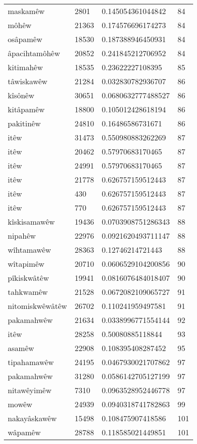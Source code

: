 \begin{longtable}{llll}
maskamêw & 2801 & 0.145054361044842 & 84\\
môhêw & 21363 & 0.174576696174273 & 84\\
osâpamêw & 18530 & 0.187388946450931 & 84\\
âpacihtamôhêw & 20852 & 0.241845212706952 & 84\\
kitimahêw & 18535 & 0.23622227108395 & 85\\
tâwiskawêw & 21284 & 0.032830782936707 & 86\\
kîsônêw & 30651 & 0.0680632777488527 & 86\\
kitâpamêw & 18800 & 0.105012428618194 & 86\\
pakitinêw & 24810 & 0.16486586731671 & 86\\
itêw & 31473 & 0.550980883262269 & 87\\
itêw & 20462 & 0.57970683170465 & 87\\
itêw & 24991 & 0.57970683170465 & 87\\
itêw & 21778 & 0.626757159512443 & 87\\
itêw & 430 & 0.626757159512443 & 87\\
itêw & 770 & 0.626757159512443 & 87\\
kîskisamawêw & 19436 & 0.0703908751286343 & 88\\
nipahêw & 22976 & 0.0921620493711147 & 88\\
wîhtamawêw & 28363 & 0.12746214721443 & 88\\
wîtapimêw & 20710 & 0.0606529104200856 & 90\\
pîkiskwâtêw & 19941 & 0.0816076484018407 & 90\\
tahkwamêw & 21528 & 0.0672082109065727 & 91\\
nitomiskwêwâtêw & 26702 & 0.110241959497581 & 91\\
pakamahwêw & 21634 & 0.0338996771554144 & 92\\
itêw & 28258 & 0.50080885118844 & 93\\
asamêw & 22908 & 0.108395408287452 & 95\\
tipahamawêw & 24195 & 0.0467930021707862 & 97\\
pakamahwêw & 31280 & 0.0586142705127199 & 97\\
nitawêyimêw & 7310 & 0.0963528952446778 & 97\\
mowêw & 24939 & 0.0940318741782863 & 99\\
nakayâskawêw & 15498 & 0.108475907418586 & 101\\
wâpamêw & 28788 & 0.118585021449851 & 101\\

\end{longtable}
